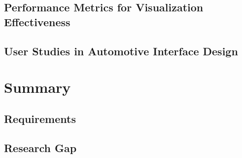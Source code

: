 \subsection{Performance Metrics for Visualization Effectiveness}
\subsection{User Studies in Automotive Interface Design}

\section{Summary}
\subsection{Requirements}
\subsection{Research Gap}


